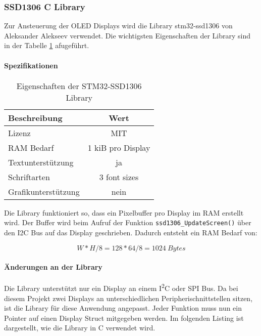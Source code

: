 \subsubsection{SSD1306 C Library}
\label{sec:Library_ssd1306}

Zur Ansteuerung der OLED Displays wird die Library stm32-ssd1306 von Aleksander Alekseev \cite{stm32-ssd1306} verwendet. Die wichtigsten Eigenschaften der Library sind in der Tabelle \ref{tab:LibSSD1306} afugeführt.

\paragraph{Spezifikationen}

\begin{table}[H]
	\centering
	\begin{tabular}{|l|c|}
		\hline
		\textbf{Beschreibung} & \textbf{Wert}     \\ \hline
		Lizenz                & MIT               \\ \hline
		RAM Bedarf            & 1 kiB pro Display \\ \hline
		Textunterstützung     & ja                \\ \hline
		Schriftarten          & 3 font sizes      \\ \hline
		Grafikunterstützung   & nein              \\ \hline
	\end{tabular}
	\caption{Eigenschaften der STM32-SSD1306 Library}
	\label{tab:LibSSD1306}
\end{table}

Die Library funktioniert so, dass ein Pixelbuffer pro Display im RAM erstellt wird.
Der Buffer wird beim Aufruf der Funktion \texttt{ssd1306\_UpdateScreen()} über den I2C Bus auf das Display geschrieben.
Dadurch entsteht ein RAM Bedarf von:

\begin{equation}
W * H / 8 = 128 * 64 / 8 = 1024\ \si{Bytes}
\end{equation}

\paragraph{Änderungen an der Library}

Die Library unterstützt nur ein Display an einem I\textsuperscript{2}C oder SPI Bus. Da bei diesem Projekt zwei Displays an unterschiedlichen Peripherischnittstellen sitzen, ist die Library für diese Anwendung angepasst.
Jeder Funktion muss nun ein Pointer auf einen Display Struct mitgegeben werden.
Im folgenden Listing ist dargestellt, wie die Library in C verwendet wird.

